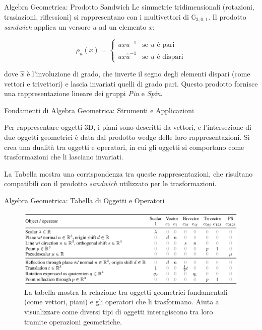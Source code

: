 \begin{frame}{Algebra Geometrica: Prodotto Sandwich}
    Le simmetrie tridimensionali (rotazioni, traslazioni, riflessioni) si rappresentano 
    con i multivettori di \( \mathbb{G}_{3,0,1} \). Il prodotto \textit{sandwich} applica 
    un versore \( u \) ad un elemento \( x \):

    \begin{equation}
        \rho_u(x) = 
        \begin{cases}
            u x u^{-1} & \text{se } u \text{ è pari} \\
            u x \hat{u}^{-1} & \text{se } u \text{ è dispari}
        \end{cases}
    \label{eq:4}
    \end{equation}

    dove \( \hat{x} \) è l'involuzione di grado, che inverte il segno degli elementi 
    dispari (come vettori e trivettori) e lascia invariati quelli di grado pari. 
    Questo prodotto fornisce una rappresentazione lineare dei gruppi \textit{Pin} e 
    \textit{Spin}.

\end{frame}

\begin{frame}{Fondamenti di Algebra Geometrica: Strumenti e Applicazioni}

    Per rappresentare oggetti 3D, i piani sono descritti da vettori, e l'intersezione 
    di due oggetti geometrici è data dal prodotto wedge delle loro rappresentazioni. 
    Si crea una dualità tra oggetti e operatori, in cui gli oggetti 
    si comportano come trasformazioni che li lasciano invariati.

    La Tabella mostra una corrispondenza tra queste rappresentazioni, che risultano 
    compatibili con il prodotto \textit{sandwich} utilizzato per le trasformazioni.

\end{frame}

\begin{frame}{Algebra Geometrica: Tabella di Oggetti e Operatori}
    \begin{figure}
        \centering
        \includegraphics[width=1\textwidth]{../Images/relazioneOggettiOperatori.png}
        \caption{La tabella mostra la relazione tra oggetti geometrici fondamentali 
        (come vettori, piani) e gli operatori che li trasformano. Aiuta a visualizzare come 
        diversi tipi di oggetti interagiscono tra loro tramite operazioni geometriche.}
        \label{fig:relazioneOggettiOperatori}
    \end{figure}
\end{frame}

